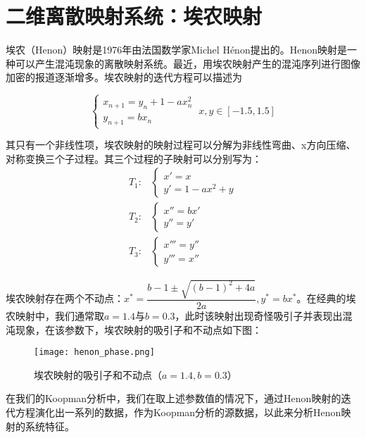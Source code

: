 \section{二维离散映射系统：埃农映射}
埃农（Henon）映射是1976年由法国数学家Michel H\'{e}non提出的。Henon映射是一种可以产生混沌现象的离散映射系统。最近，用埃农映射产生的混沌序列进行图像加密的报道逐渐增多。埃农映射的迭代方程可以描述为

\begin{equation}
    \begin{cases}
        x_{n+1}=y_n+1-ax_n^2\\
        y_{n+1}=bx_n
    \end{cases}\ x,y\in [-1.5,1.5]
\end{equation}

其只有一个非线性项，埃农映射的映射过程可以分解为非线性弯曲、x方向压缩、对称变换三个子过程。其三个过程的子映射可以分别写为：
\begin{equation}
    \begin{aligned}
        T_1: & \begin{cases}
            x'=x\\
            y'=1-ax^2+y
        \end{cases}\\
        T_2: & \begin{cases}
            x''=bx'\\
            y''=y'
        \end{cases}\\
        T_3: & \begin{cases}
            x'''=y''\\
            y'''=x''
        \end{cases}
    \end{aligned}
\end{equation}

埃农映射存在两个不动点：$x^*=\dfrac{b-1\pm\sqrt{(b-1)^2+4a}}{2a},y^*=bx^*$。在经典的埃农映射中，我们通常取$a=1.4$与$b=0.3$，此时该映射出现奇怪吸引子并表现出混沌现象，在该参数下，埃农映射的吸引子和不动点如下图：
\begin{figure}
	\centering
	\texttt{[image: henon\_phase.png]}
    \caption{埃农映射的吸引子和不动点（$a=1.4,b=0.3$）}
    \label{fig:logi_lypn}
\end{figure}

在我们的Koopman分析中，我们在取上述参数值的情况下，通过Henon映射的迭代方程演化出一系列的数据，作为Koopman分析的源数据，以此来分析Henon映射的系统特征。